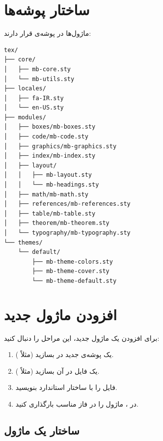
\section{ساختار پوشه‌ها}
\label{sec:modules-structure}

ماژول‌ها در پوشه‌ی  قرار دارند:

\begin{latin}
\begin{verbatim}
tex/
├── core/
│   ├── mb-core.sty
│   └── mb-utils.sty
├── locales/
│   ├── fa-IR.sty
│   └── en-US.sty
├── modules/
│   ├── boxes/mb-boxes.sty
│   ├── code/mb-code.sty
│   ├── graphics/mb-graphics.sty
│   ├── index/mb-index.sty
│   ├── layout/
│   │   ├── mb-layout.sty
│   │   └── mb-headings.sty
│   ├── math/mb-math.sty
│   ├── references/mb-references.sty
│   ├── table/mb-table.sty
│   ├── theorem/mb-theorem.sty
│   └── typography/mb-typography.sty
└── themes/
    └── default/
        ├── mb-theme-colors.sty
        ├── mb-theme-cover.sty
        └── mb-theme-default.sty
\end{verbatim}
\end{latin}


\section{افزودن ماژول جدید}
\label{sec:modules-adding}

برای افزودن یک ماژول جدید، این مراحل را
دنبال کنید:

\begin{enumerate}
    \item یک پوشه‌ی جدید در
     بسازید (مثلاً
    ).

    \item یک فایل  در آن بسازید
    (مثلاً ).

    \item فایل را با ساختار استاندارد
    بنویسید.

    \item در ، ماژول را
    در فاز مناسب بارگذاری کنید.
\end{enumerate}

\subsection{ساختار یک ماژول}
\label{sec:modules-template}

